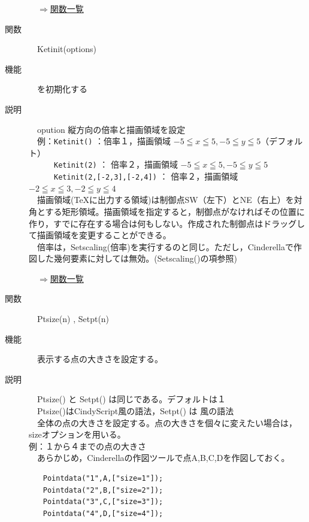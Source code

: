 \documentclass[papersize,a4paper,12pt,uplatex]{jsarticle}
\begin{document}
\begin{description}
\begin{flushright}　\hyperlink{functionlist}{$\Rightarrow$関数一覧}\end{flushright}
\newpage
\hypertarget{ketinit}{}
\item[関数]　Ketinit(options)
\item[機能]　\ketcindy を初期化する
\item[説明]　opution 縦方向の倍率と描画領域を設定\\

　例：\verb|Ketinit()|   ：倍率１，描画領域 $-5 \leqq x \leqq 5 , -5 \leqq y \leqq 5$（デフォルト）\\
　　　\verb|Ketinit(2)| ： 倍率２，描画領域 $-5 \leqq x \leqq 5 , -5 \leqq y \leqq 5$\\
　　　\verb|Ketinit(2,[-2,3],[-2,4])| ： 倍率２，描画領域 $-2 \leqq x \leqq 3 , -2 \leqq y \leqq 4$\\

　描画領域(TeXに出力する領域)は制御点SW（左下）とNE（右上）を対角とする矩形領域。描画領域を指定すると，制御点がなければその位置に作り，すでに存在する場合は何もしない。作成された制御点はドラッグして描画領域を変更することができる。\\
　倍率は，Setscaling(倍率)を実行するのと同じ。ただし，Cinderellaで作図した幾何要素に対しては無効。(Setscaling()の項参照)\\

\begin{flushright}　\hyperlink{functionlist}{$\Rightarrow$関数一覧}\end{flushright}

\hypertarget{ptsie}{}
\item[関数]　Ptsize(n) , Setpt(n)
\item[機能]　表示する点の大きさを設定する。
\item[説明]　Ptsize() と Setpt() は同じである。デフォルトは１\\
　Ptsize()はCindyScript風の語法，Setpt() は \ketpic 風の語法\\
　全体の点の大きさを設定する。点の大きさを個々に変えたい場合は，sizeオプションを用いる。\\

例：１から４までの点の大きさ\\
　あらかじめ，Cinderellaの作図ツールで点A,B,C,Dを作図しておく。
\begin{verbatim}
　　Pointdata("1",A,["size=1"]);
　　Pointdata("2",B,["size=2"]);
　　Pointdata("3",C,["size=3"]);
　　Pointdata("4",D,["size=4"]);
\end{verbatim}


\end{description}
\end{document}
